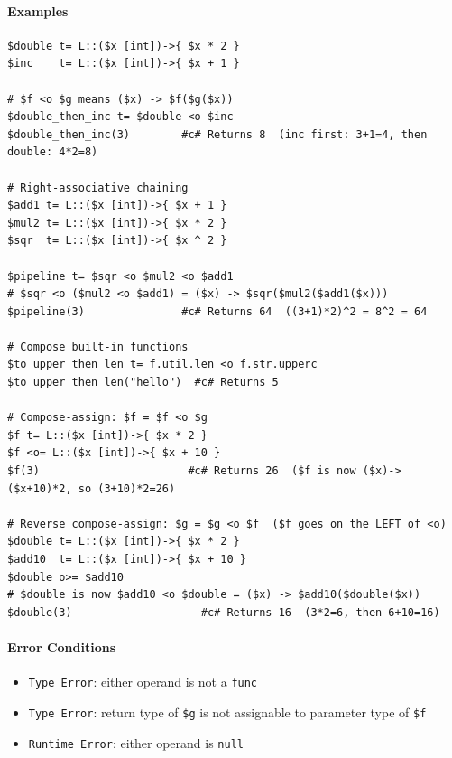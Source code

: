 \paragraph{Examples}
\begin{verbatim}
$double t= L::($x [int])->{ $x * 2 }
$inc    t= L::($x [int])->{ $x + 1 }

# $f <o $g means ($x) -> $f($g($x))
$double_then_inc t= $double <o $inc
$double_then_inc(3)        #c# Returns 8  (inc first: 3+1=4, then double: 4*2=8)

# Right-associative chaining
$add1 t= L::($x [int])->{ $x + 1 }
$mul2 t= L::($x [int])->{ $x * 2 }
$sqr  t= L::($x [int])->{ $x ^ 2 }

$pipeline t= $sqr <o $mul2 <o $add1
# $sqr <o ($mul2 <o $add1) = ($x) -> $sqr($mul2($add1($x)))
$pipeline(3)               #c# Returns 64  ((3+1)*2)^2 = 8^2 = 64

# Compose built-in functions
$to_upper_then_len t= f.util.len <o f.str.upperc
$to_upper_then_len("hello")  #c# Returns 5

# Compose-assign: $f = $f <o $g
$f t= L::($x [int])->{ $x * 2 }
$f <o= L::($x [int])->{ $x + 10 }
$f(3)                       #c# Returns 26  ($f is now ($x)->($x+10)*2, so (3+10)*2=26)

# Reverse compose-assign: $g = $g <o $f  ($f goes on the LEFT of <o)
$double t= L::($x [int])->{ $x * 2 }
$add10  t= L::($x [int])->{ $x + 10 }
$double o>= $add10
# $double is now $add10 <o $double = ($x) -> $add10($double($x))
$double(3)                    #c# Returns 16  (3*2=6, then 6+10=16)
\end{verbatim}

\paragraph{Error Conditions}
\begin{itemize}
\item \texttt{Type Error}: either operand is not a \texttt{func}
\item \texttt{Type Error}: return type of \texttt{\$g} is not assignable to parameter type of \texttt{\$f}
\item \texttt{Runtime Error}: either operand is \texttt{null}
\end{itemize}

